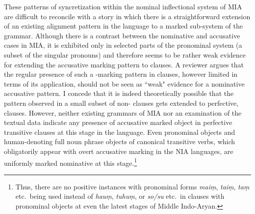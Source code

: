 \documentclass[output=paper,
modfonts
]{LSP/langsci}
\begin{document}
These patterns of syncretization within the nominal inflectional system of MIA  
are difficult to reconcile with a story in which there is a straightforward extension of an existing alignment pattern in the language to a marked sub-system of the grammar. 
Although there is a   contrast between the nominative and accusative cases in MIA, it is exhibited only  in selected parts of the pronominal system (a subset of the singular pronouns) and therefore seems to be rather weak evidence for extending the accusative marking pattern to  clauses. A reviewer argues that the regular presence of such a -marking pattern in  clauses, however limited in terms of its application,  should not be seen as ``weak" evidence for a nominative accusative pattern.  I concede  that it is indeed theoretically possible that the pattern observed in a small  subset of  non- clauses gets extended to  perfective,  clauses. However,
neither existing grammars of MIA \citep{pischel00,vale48,declercq2010} nor an examination of the textual data indicate  any  presence of accusative marked object  in perfective transitive clauses at this stage in the language. Even  pronominal objects  and human-denoting full noun phrase objects  of canonical transitive verbs, which obligatorily appear with overt accusative marking in the NIA languages,  are uniformly marked nominative at this stage.\footnote{Thus, there are no positive  instances with pronominal forms  \textit{maiṃ}, \textit{taiṃ},  \textit{taṃ} etc.\ being used instead of \textit{hauṃ}, \textit{tuhuṃ}, or \textit{so/su} etc.\  in  clauses with pronominal objects at even the latest stages of Middle Indo-Aryan.} 
\end{document}
